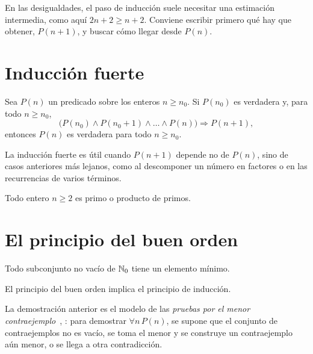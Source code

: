 En las desigualdades, el paso de inducción suele necesitar una estimación intermedia, como aquí $2n+2\ge n+2$. Conviene escribir primero qué hay que obtener, $P(n+1)$, y buscar cómo llegar desde $P(n)$.

\addtocounter{definicion}{1}%

\section{Inducción fuerte}

\begin{teorema}\label{teo:induccion-fuerte}
Sea $P(n)$ un predicado sobre los enteros $n\ge n_0$. Si $P(n_0)$ es verdadera y, para todo $n\ge n_0$,
\[
\bigl(P(n_0)\wedge P(n_0+1)\wedge\dots\wedge P(n)\bigr)\Rightarrow P(n+1),
\]
entonces $P(n)$ es verdadera para todo $n\ge n_0$.
\end{teorema}

La inducción fuerte es útil cuando $P(n+1)$ depende no de $P(n)$, sino de casos anteriores más lejanos, como al descomponer un número en factores o en las recurrencias de varios términos.

\begin{teorema}\label{teo:factorizacion}
Todo entero $n\ge 2$ es primo o producto de primos.
\end{teorema}

\addtocounter{definicion}{1}%

\section{El principio del buen orden}

\begin{teorema}\label{teo:buen-orden}
Todo subconjunto no vacío de $\mathbb{N}_0$ tiene un elemento mínimo.
\end{teorema}

\begin{proposicion}\label{prop:bo-induccion}
El principio del buen orden implica el principio de inducción.
\end{proposicion}

La demostración anterior es el modelo de las \emph{pruebas por el menor contraejemplo}~\cite[§2.2]{mcs}, \cite[§10.3]{hammack}: para demostrar $\forall n\,P(n)$, se supone que el conjunto de contraejemplos no es vacío, se toma el menor y se construye un contraejemplo aún menor, o se llega a otra contradicción.

